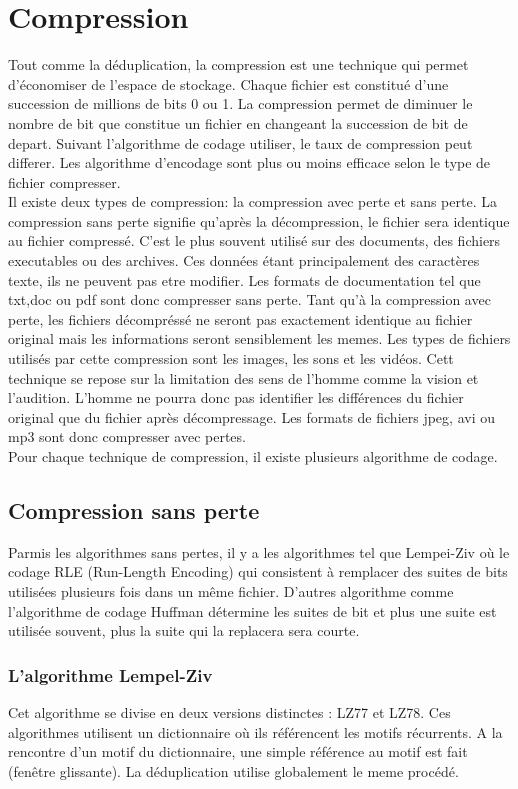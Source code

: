 \documentclass[a4paper]{report}
\begin{document}
	\chapter*{Compression}
	Tout comme la déduplication, la compression est une technique qui permet d'économiser de l'espace de stockage. Chaque fichier est constitué d'une succession de millions de bits 0 ou 1. La compression permet de diminuer le nombre de bit que constitue un fichier en changeant la succession de bit de depart. Suivant l'algorithme de codage utiliser, le taux de compression peut differer. Les algorithme d'encodage sont plus ou moins efficace selon le type de fichier compresser.\\
 Il existe deux types de compression: la compression avec perte et sans perte. La compression sans perte signifie qu'après la décompression, le fichier sera identique au fichier compressé. C'est le plus souvent utilisé sur des documents, des fichiers executables ou des archives. Ces données étant principalement des caractères texte, ils ne peuvent pas etre modifier. Les formats de documentation tel que txt,doc ou pdf sont donc compresser sans perte.  Tant qu'à la compression avec perte, les fichiers décompréssé ne seront pas exactement identique au fichier original mais les informations seront sensiblement les memes. Les types de fichiers utilisés par cette compression sont les images, les sons et les vidéos. Cett technique se repose sur la limitation des sens de l'homme comme la vision et l'audition. L'homme ne pourra donc pas identifier les différences du fichier original que du fichier après décompressage. Les formats de fichiers jpeg, avi ou mp3 sont donc compresser avec pertes. \\
Pour chaque technique de compression, il existe plusieurs algorithme de codage.\\
	\section{Compression sans perte}
	Parmis les algorithmes sans pertes, il y a les algorithmes tel que Lempei-Ziv où le codage RLE (Run-Length Encoding) qui consistent à remplacer des suites de bits utilisées plusieurs fois dans un même fichier. D'autres algorithme comme l'algorithme de codage Huffman détermine les suites de bit et plus une suite est utilisée souvent, plus la suite qui la replacera sera courte.
	\subsection{L'algorithme Lempel-Ziv}
		Cet algorithme se divise en deux versions distinctes : LZ77 et LZ78. Ces algorithmes utilisent un dictionnaire où ils référencent les motifs récurrents. A la rencontre d'un motif du dictionnaire, une simple référence au motif est fait (fenêtre glissante). La déduplication utilise globalement le meme procédé.\\
\end{document}
